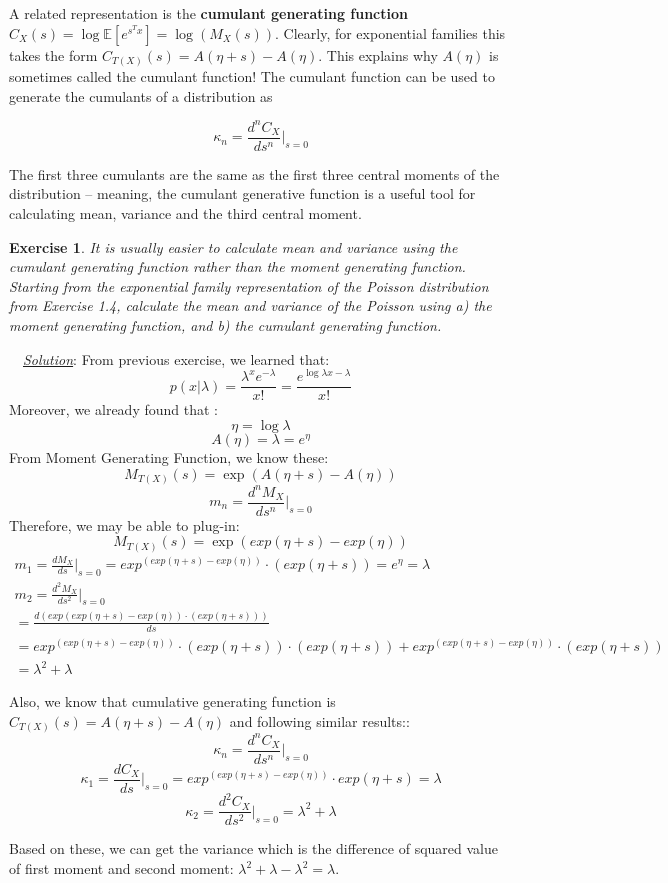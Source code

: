 \documentclass[twoside]{article}
\newcounter{lecnum}
\newtheorem{exercise}{Exercise}[lecnum]
\newenvironment{solution}{
  \begin{flushleft} \noindent ~~\underline{\emph{Solution}}: \rmfamily}{\end{flushleft}}
\newcommand\E{\mathbb{E}}
\begin{document}
A related representation is the \textbf{cumulant generating function} $C_X(s) = \log \E[e^{s^Tx}] = \log(M_X(s))$. Clearly, for exponential families this takes the form $C_{T(X)}(s) = A(\eta+s)-A(\eta)$. This explains why $A(\eta)$ is sometimes called the cumulant function! The cumulant function can be used to generate the cumulants of a distribution as

$$\kappa_n = \frac{d^nC_X}{ds^n}\Bigr|_{s=0}$$

The first three cumulants are the same as the first three central moments of the distribution -- meaning, the cumulant generative function is a useful tool for calculating mean, variance and the third central moment.

\begin{exercise}
  It is usually easier to calculate mean and variance using the cumulant generating function rather than the moment generating function. Starting from the exponential family representation of the Poisson distribution from Exercise 1.4, calculate the mean and variance of the Poisson using a) the moment generating function, and b) the cumulant generating function.
  \end{exercise}
  
\begin{solution}
From previous exercise, we learned that: 
$$ p(x|\lambda) = \frac{\lambda^x e^{-\lambda}}{x!} = \frac{e^{\log{\lambda x}-\lambda}}{x!} $$
Moreover, we already found that :
$$ \eta = \log{\lambda} $$
$$ A(\eta) = \lambda = e^{\eta} $$ 
From Moment Generating Function, we know these: 
$$M_{T(X)}(s) = \exp{(A(\eta+s) - A(\eta))}$$
$$m_n = \frac{d^nM_X}{ds^n}\Bigr|_{s=0}$$
Therefore, we may be able to plug-in:
$$M_{T(X)}(s) = \exp{(exp(\eta+s) - exp(\eta))}$$
\begin{equation*}
\begin{split}
m_1 = \frac{dM_X}{ds}\Bigr|_{s=0} = exp^{(exp(\eta+s) - exp(\eta))} \cdot (exp(\eta+s)) = e^\eta = \lambda \\
m_2 = \frac{d^2M_X}{ds^2}\Bigr|_{s=0} \\ = \frac{d(exp{(exp(\eta+s) - exp(\eta))} \cdot (exp(\eta+s)))}{ds} \\
= exp^{(exp(\eta+s) - exp(\eta))} \cdot (exp(\eta+s)) \cdot (exp(\eta+s)) + exp^{(exp(\eta+s) - exp(\eta))} \cdot (exp(\eta+s)) \\ 
= \lambda^2 + \lambda 
\end{split}
\end{equation*}

Also, we know that cumulative generating function is $C_{T(X)}(s) = A(\eta+s)-A(\eta)$ and following similar results::
$$\kappa_n = \frac{d^nC_X}{ds^n}\Bigr|_{s=0}$$
$$\kappa_1 = \frac{dC_X}{ds}\Bigr|_{s=0} = exp^{(exp(\eta+s) - exp(\eta))} \cdot exp(\eta+s) = \lambda$$
$$\kappa_2 = \frac{d^2 C_X}{ds^2}\Bigr|_{s=0} = \lambda^2 + \lambda $$

Based on these, we can get the variance which is the difference of squared value of first moment and second moment: $\lambda^2 + \lambda - \lambda^2 = \lambda$.

\end{solution}
\end{document}
